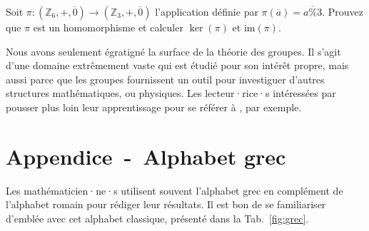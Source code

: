 \documentclass[french,course,oneside,theoremnosection]{lecture}
\makeatletter
\newcommand\backmatter{%
  \if@openright
    \cleardoublepage
  \else
    \clearpage
  \fi
   }
\newenvironment{further}[1]
{\begin{tcolorbox}[colframe=gray!50, colback=gray!5, arc=0pt, outer arc=0pt, boxrule=0.5pt, title=#1, breakable]}
{\end{tcolorbox}}
\newcommand{\Z}{\mathbb{Z}}
\newcommand{\im}{\mathrm{im}}
\makeatother
\begin{document}
\begin{exercise}
Soit $\pi\colon (\Z_6, +, \overline{0}) \to (\Z_3, +, \overline{0})$ l'application définie par $\pi(\overline{a})=\overline{a\%3}$. Prouvez que $\pi$ est un homomorphisme et calculer $\ker(\pi)$ et $\im(\pi)$.
\end{exercise}

\begin{further}{Un vaste champ à investiguer}
Nous avons seulement égratigné la surface de la théorie des groupes. Il s'agit d'une domaine extrêmement vaste qui est étudié pour son intérêt propre, mais aussi parce que les groupes fournissent un outil pour investiguer d'autres structures mathématiques, ou physiques. Les lecteur·rice·s intéressées par pousser plus loin leur apprentissage pour se référer à  \cite{Rotman1995}, par exemple.
\end{further}






\backmatter
\section{Appendice~-~Alphabet grec}
Les mathématicien·ne·s utilisent souvent l'alphabet grec en complément de l'alphabet romain pour rédiger leur résultats. Il est bon de se familiariser d'emblée avec cet alphabet classique, présenté dans la Tab.~\ref{fig:grec}.
\end{document}
